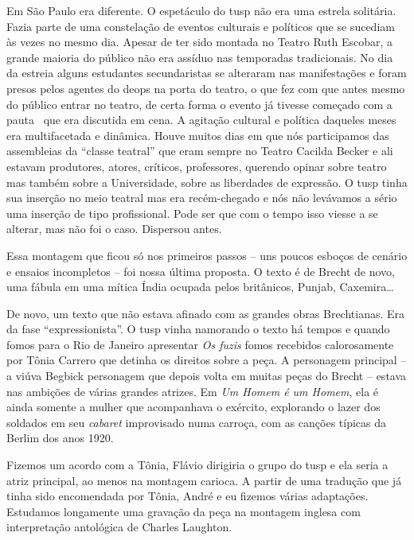 Em São Paulo era diferente. O espetáculo do {\sc tusp} não era uma estrela
solitária. Fazia parte de uma constelação de eventos culturais e
políticos que se sucediam às vezes no mesmo dia. Apesar de ter sido
montada no Teatro Ruth Escobar, a grande maioria do público não era
assíduo nas temporadas tradicionais. No dia da estreia alguns estudantes
secundaristas se alteraram nas manifestações e foram presos pelos
agentes do {\sc deops} na porta do teatro, o que fez com que antes mesmo do
público entrar no teatro, de certa forma o evento já tivesse começado
com a pauta ~que era discutida em cena. A agitação cultural e política
daqueles meses era multifacetada e dinâmica. Houve muitos dias em que
nós participamos das assembleias da “classe teatral” que eram sempre no
Teatro Cacilda Becker e ali estavam produtores, atores, críticos,
professores, querendo opinar sobre teatro mas também sobre a
Universidade, sobre as liberdades de expressão. O {\sc tusp} tinha sua
inserção no meio teatral mas era recém-chegado e nós não levávamos a
sério uma inserção de tipo profissional. Pode ser que com o tempo isso
viesse a se alterar, mas não foi o caso. Dispersou antes.

\subject{A montagem truncada de “Mann ist Mann”}

Essa montagem que ficou só nos primeiros passos -- uns poucos esboços de
cenário e ensaios incompletos -- foi nossa última proposta. O texto é de
Brecht de novo, uma fábula em uma mítica Índia ocupada pelos britânicos,
Punjab, Caxemira\ldots{}

De novo, um texto que não estava afinado com as grandes obras
Brechtianas. Era da fase “expressionista”. O {\sc tusp} vinha namorando o
texto há tempos e quando fomos para o Rio de Janeiro apresentar {\it Os
fuzis} fomos recebidos calorosamente por Tônia Carrero que detinha os
direitos sobre a peça. A personagem principal -- a viúva Begbick
personagem que depois volta em muitas peças do Brecht -- estava nas
ambições de várias grandes atrizes. Em {\it Um Homem é um Homem}, ela é
ainda somente a mulher que acompanhava o exército, explorando o lazer
dos soldados em seu {\it cabaret} improvisado numa carroça, com as
canções típicas da Berlim dos anos 1920.

Fizemos um acordo com a Tônia, Flávio dirigiria o grupo do {\sc tusp} e ela
seria a atriz principal, ao menos na montagem carioca. A partir de uma
tradução que já tinha sido encomendada por Tônia, André e eu fizemos
várias adaptações. Estudamos longamente uma gravação da peça na montagem
inglesa com interpretação antológica de Charles Laughton.

